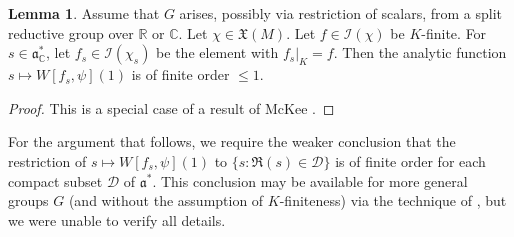\documentclass[reqno]{amsart}
\theoremstyle{plain} \newtheorem{theorem} {Theorem}
\theoremstyle{definition} \newtheorem{definition} [theorem] {Definition}
\theoremstyle{itplain} %
\newtheorem{lemma}[theorem]{Lemma}
\numberwithin{equation}{section}
\numberwithin{theorem}{section}
\renewcommand{\leq}{\leqslant}
\begin{document}
\begin{lemma}\label{lem:assume-that-g}
  Assume that $G$ arises, possibly via restriction of scalars, from a split reductive group over $\mathbb{R}$ or $\mathbb{C}$.  Let $\chi \in \mathfrak{X}(M)$.  Let $f \in \mathcal{I}(\chi)$ be $K$-finite.  For $s \in \mathfrak{a}_{\mathbb{C}}^*$, let $f_s \in \mathcal{I}(\chi_s)$ be the element with $f_s|_K = f$.  Then the analytic function $s \mapsto W[f_s,\psi](1)$ is of finite order $\leq 1$.
\end{lemma}
\begin{proof}
  This is a special case of a result of McKee \cite[Thm 5.2]{MR3043499}.
\end{proof}
\begin{remark}
  For the argument that follows, we require the weaker conclusion that the restriction of $s \mapsto W[f_s,\psi](1)$ to $\{s : \Re(s) \in \mathcal{D} \}$ is of finite order for each compact subset $\mathcal{D}$ of $\mathfrak{a}^*$.  This conclusion may be available for more general groups $G$ (and without the assumption of $K$-finiteness) via the technique of \cite[Proof of Lemma 5.6]{MR1800349}, but we were unable to verify all details.
\end{remark}
\end{document}
